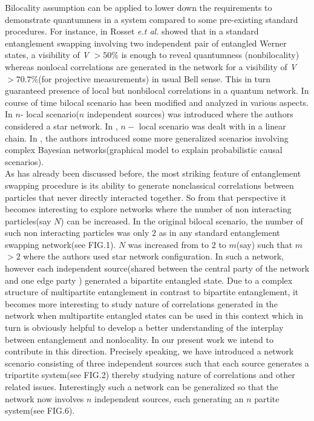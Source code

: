\documentclass[pra,10pt,twocolumn,superscriptaddress,floatfix,showpacs]{revtex4-1}
\begin{document}
 Bilocality assumption can be applied to lower down the requirements to demonstrate quantumness in a system compared to some pre-existing standard procedures. For instance, in \cite{BRAN} Rosset \textit{e.t al.} showed that in a standard entanglement swapping involving two independent pair of entangled Werner states\cite{Wer}, a visibility of \textit{V} $> 50\%$ is enough to reveal quantumness (nonbilocality)  whereas nonlocal correlations are generated in the network for a visibility of \textit{V}$> 70.7\%$(for projective measurements\cite{Wer}) in usual Bell sense. This in turn guaranteed presence of local but nonbilocal correlations in a quantum network. In course of time bilocal scenario has been modified and analyzed in various aspects\cite{Tav,km,raf,den,kmb}. In \cite{Tav} $n$- local scenario($n$ independent sources) was introduced where the authors considered a star network. In \cite{km}, $n-$ local scenario was dealt with in a linear chain. In \cite{raf}, the authors introduced some more generalized scenarios involving complex Bayesian networks(graphical model to explain probabilistic causal scenarios). \\
As has already been discussed before, the most striking feature of entanglement swapping procedure is its ability to generate nonclassical correlations between particles that never directly interacted together. So from that perspective it becomes interesting to explore networks where the number of non interacting particles(say $N$) can be increased. In the original bilocal scenario\cite{BRA}, the number of such non interacting particles was only $2$ as in any standard entanglement swapping network(see FIG.1). $N$ was increased from to $2$ to $m$(say) such that $m$$>$$2$ where the authors used star network configuration\cite{Tav}. In such a network, however each independent source(shared between the central party of the network and one edge party \cite{Tav}) generated a bipartite entangled state.  Due to a complex structure of multipartite entanglement\cite{review} in contrast to bipartite entanglement, it becomes more interesting to study nature of correlations generated in the network when multipartite entangled states can be used in this context which in turn is obviously helpful to develop a better understanding of the interplay between entanglement and nonlocality. In our present work we intend to contribute in this direction. Precisely speaking, we have introduced a network scenario consisting of three independent sources such that each source generates a tripartite system(see FIG.2) thereby studying nature of correlations and other related issues. Interestingly such a network can be generalized so that the network now involves $n$ independent sources, each generating an $n$ partite system(see FIG.6).  \\
\end{document}
